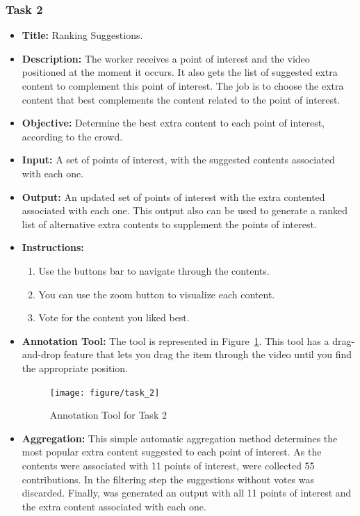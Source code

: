 \subsubsection{Task 2}



\begin{itemize}

\item \textbf{Title:} Ranking Suggestions.

\item \textbf{Description:} The worker receives a point of interest and the video positioned at the moment it occurs. It also gets the list of suggested extra content to complement this point of interest. The job is to choose the extra content that best complements the content related to the point of interest.

\item \textbf{Objective:} Determine the best extra content to each point of interest, according to the crowd.


\item \textbf{Input:} A set of points of interest, with the suggested contents associated with each one.


\item \textbf{Output:} An updated set of points of interest with the extra contented associated with each one. This output also can be used to generate a ranked list of alternative extra contents to supplement the points of interest.


\item \textbf{Instructions:} \begin{enumerate}
	\item Use the buttons bar to navigate through the contents.
	\item You can use the zoom button to visualize each content.
	\item Vote for the content you liked best.
\end{enumerate}


\item \textbf{Annotation Tool:} The tool is represented in Figure~\ref{task_2}. This tool has a drag-and-drop feature that lets you drag the item through the video until you find the appropriate position.
\begin{figure}[h!]
	\centerline{\texttt{[image: figure/task\_2]}}
	\caption{Annotation Tool for Task 2}
	\label{task_2}
\end{figure}

\item \textbf{Aggregation:} This simple automatic aggregation method determines the most popular extra content suggested to each point of interest. As the contents were associated with 11 points of interest, were collected 55 contributions. In the filtering step the suggestions without votes was discarded. Finally, was generated an output with all 11 points of interest and the extra content associated with each one. 

\end{itemize}




